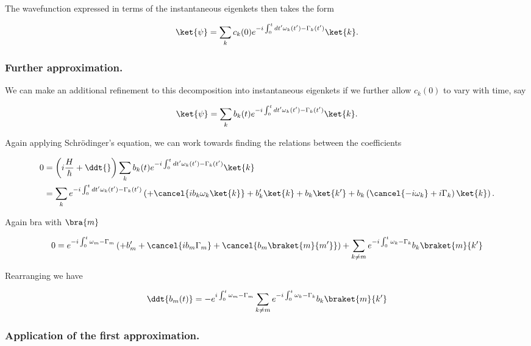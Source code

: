 The wavefunction expressed in terms of the instantaneous eigenkets then takes the form

\begin{equation}\label{eqn:qmTwoExamReflection:510}
\ket{\psi}
=
\sum_k c_k(0) e^{-i \int_0^t dt' \omega_k(t') - \Gamma_k(t') } \ket{k}.
\end{equation}

\subsubsection{Further approximation.}
We can make an additional refinement to this decomposition into instantaneous eigenkets if we further allow $c_k(0)$ to vary with time, say

\begin{equation}\label{eqn:qmTwoExamReflection:530}
\ket{\psi}
=
\sum_k b_k(t) e^{-i \int_0^t dt' \omega_k(t') - \Gamma_k(t') } \ket{k}.
\end{equation}

Again applying Schr\"{o}dinger's equation, we can work towards finding the relations between the coefficients

\begin{align*}
0 
&=
\left( i\frac{H}{\hbar} + \ddt{} \right)
\sum_k b_k(t) e^{-i \int_0^t dt' \omega_k(t') - \Gamma_k(t') } \ket{k} 
\\
&=
\sum_k e^{-i \int_0^t dt' \omega_k(t') - \Gamma_k(t') } 
\left(
+ \cancel{i b_k \omega_k \ket{k} }
+ b_k' \ket{k} 
+ b_k \ket{k'} 
+ b_k \left( \cancel{-i \omega_k} +i \Gamma_k \right) \ket{k} 
\right).
\end{align*}

Again bra with $\bra{m}$

\begin{align*}
0 
=
e^{-i \int_0^t  \omega_m - \Gamma_m } 
\left(
+ b_m' 
+ \cancel{i b_m \Gamma_m }
+ \cancel{b_m \braket{m}{m'} }
\right)
+\sum_{k\ne m} e^{-i \int_0^t  \omega_k - \Gamma_k } b_k \braket{m}{k'} 
\end{align*}

Rearranging we have

\begin{equation}\label{eqn:qmTwoExamReflection:550}
\ddt{b_m(t)} = 
-
e^{i \int_0^t  \omega_m - \Gamma_m } 
\sum_{k\ne m} e^{-i \int_0^t \omega_k - \Gamma_k } b_k \braket{m}{k'} 
\end{equation}

\subsubsection{Application of the first approximation.}

